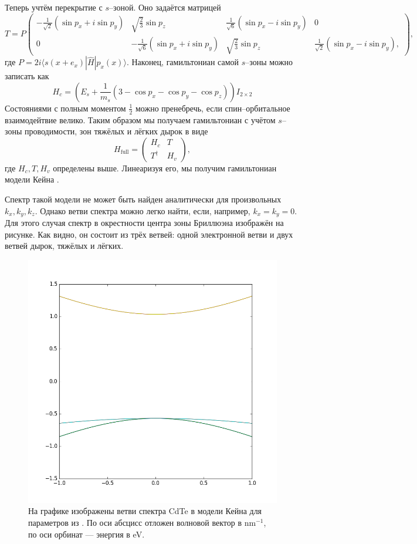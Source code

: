 Теперь учтём перекрытие с $s$--зоной. Оно задаётся матрицей
\begin{equation}
    T = P\begin{pmatrix}
            -\frac{1}{\sqrt{2}}(\sin{p_x} + i\sin{p_y}) & \sqrt{\frac{2}{3}}\sin{p_z} &
             \frac{1}{\sqrt{6}}(\sin{p_x} - i\sin{p_y}) & 0 \\  
            0 & -\frac{1}{\sqrt{6}}(\sin{p_x} + i\sin{p_y}) & 
            \sqrt{\frac{2}{3}}\sin{p_z} & \frac{1}{\sqrt{2}}(\sin{p_x} - i\sin{p_y}),
         \end{pmatrix},
\end{equation}
где $P = 2i\langle s(x+e_x) | \hat{H} | p_x(x)\rangle$. Наконец, гамильтониан самой 
$s$--зоны можно записать как 
\begin{equation}
    H_c = (E_s + \frac{1}{m_s}(3 - \cos{p_x} - \cos{p_y} - \cos{p_z}))I_{2\times2}
\end{equation}
Состояниями с полным моментом $\frac{1}{2}$ 
можно пренебречь, если спин--орбитальное взаимодейтвие велико.
Таким образом мы получаем гамильтониан с учётом $s$--зоны проводимости, зон тяжёлых и
лёгких дырок в виде
\begin{equation}
    \label{hfull}
    H_{\mathrm{full}} = \begin{pmatrix}
                            H_c & T \\
                            T^\dagger & H_v
                        \end{pmatrix},
\end{equation}
где $H_c, T, H_v$ определены выше. Линеаризуя его, мы получим гамильтониан модели Кейна
\cite{Kane1957}.

Спектр такой модели не может быть найден аналитически для произвольных $k_x, k_y, k_z$. Однако
ветви спектра можно легко найти, если, например, $k_x = k_y = 0$. Для этого случая 
спектр в окрестности центра зоны Бриллюэна изображён на рисунке. Как видно, он состоит
из трёх ветвей: одной электронной ветви и двух ветвей дырок, тяжёлых и лёгких.

\begin{figure}
    \centering
    \includegraphics[width=0.6\linewidth]{cdte.png}
    \caption{На графике изображены ветви спектра CdTe в модели Кейна для параметров
             из \cite{Novik2005}. По оси абсцисс отложен волновой вектор в $\mathrm{nm}^{-1}$,
             по оси орбинат --- энергия в eV.}
\end{figure}

